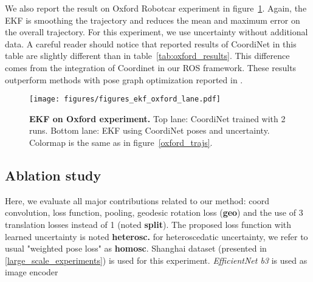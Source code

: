 \documentclass[10pt,twocolumn,letterpaper]{article}
\begin{document}
We also report the result on Oxford Robotcar experiment in figure~\ref{fig:oxford_ekf}. Again, the EKF is smoothing the trajectory and reduces the mean and maximum error on the overall trajectory. For this experiment, we use uncertainty without additional data. A careful reader should notice that reported results of CoordiNet in this table are slightly different than in table~\ref{tab:oxford_results}. This difference comes from the integration of Coordinet in our ROS framework. These results outperform methods with pose graph optimization reported in \cite{mapnet2018,RVL}.

\begin{figure}[ht]
    \centering
   \texttt{[image: figures/figures\_ekf\_oxford\_lane.pdf]}
   \caption{\textbf{EKF on Oxford experiment.} Top lane: CoordiNet trained with 2 runs. Bottom lane: EKF using CoordiNet poses and uncertainty. Colormap is the same as in figure~\ref{oxford_trajs}.}\label{fig:oxford_ekf}
\end{figure}

\subsection{Ablation study}

Here, we evaluate all major contributions related to our method: coord convolution, loss function, pooling, geodesic rotation loss (\textbf{geo}) and the use of 3 translation losses instead of 1 (noted \textbf{split}). The proposed loss function with learned uncertainty is noted \textbf{heterosc.} for heteroscedatic uncertainty, we refer to usual "weighted pose loss" as \textbf{homosc}. Shanghai dataset (presented in \ref{large_scale_experiments}) is used for this experiment. \textit{EfficientNet b3} is used as image encoder
\end{document}
